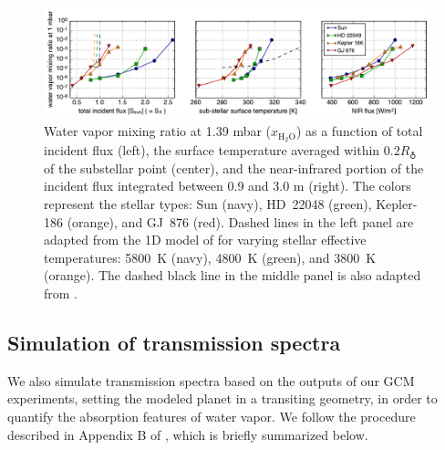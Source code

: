 \documentclass[11pt,numberedappendix,twocolappendix,]{emulateapj}
\def\water{H$_2$O}
\def\xwater{$x_\text{\water}$}
\def\preslevel{1.39 mbar}
\def\wv{water vapor}
\begin{document}
\begin{figure}[t]
    \begin{center}
    \includegraphics[width=\hsize]{xH2O_3panels_ver2.pdf}
    \end{center}
\caption{Water vapor mixing ratio at \preslevel{} (\xwater{}) as a function of total incident flux (left), the surface temperature averaged within $0.2R_\earth$ of the substellar point (center), and the near-infrared portion of the incident flux integrated between 0.9 and 3.0 \textmu m (right). The colors represent the stellar types: Sun (navy), HD~22048 (green), Kepler-186 (orange), and GJ~876 (red). Dashed lines in the left panel are adapted from the 1D model of \citet{Kopparapu2013} for varying stellar effective temperatures: 5800~K (navy), 4800~K (green), and 3800~K (orange). The dashed black line in the middle panel is also adapted from \citet{Kopparapu2013}. }           
\label{fig:xH2O_S0X}
\end{figure}

\subsection{Simulation of transmission spectra}
\label{ss:method_TransmissionSpectra}

We also simulate transmission spectra based on the outputs of our GCM experiments, setting the modeled planet in a transiting geometry, in order to quantify the absorption features of \wv{}.  
We follow the procedure described in Appendix B of \citet{Way2017}, which is briefly summarized below. 
\end{document}
